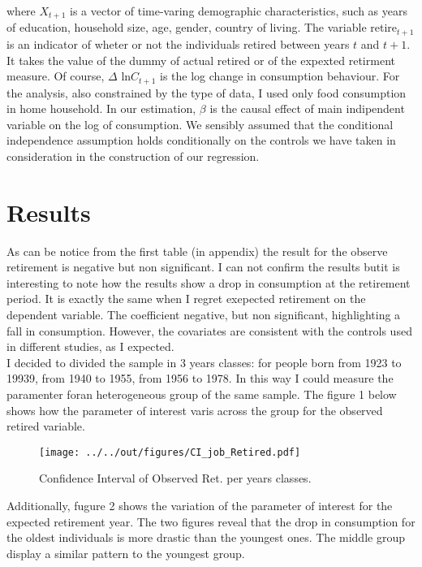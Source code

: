 where $X_{t+1}$ is a vector of time-varing demographic characteristics, such as years of education, household size, age, gender, country of living. The variable retire$_{t+1}$ is an indicator of wheter or not the individuals retired between years $t$ and $t+1$. It takes the value of the dummy of actual retired or of the expexted retirment measure. Of course, $\Delta$ ln$C_{t+1}$ is the log change in consumption behaviour. For the analysis, also constrained by the type of data, I used only food consumption in home household. In our estimation, $\beta$ is the causal effect of main indipendent variable on the log of consumption. We sensibly assumed that the conditional independence assumption holds conditionally on the controls we have taken in consideration in the construction of our regression.

\section{Results}
\label{sec:results}

As can be notice from the first table (in appendix) the result for the observe retirement is negative but non significant. I can not confirm the results butit is interesting to note how the results show a drop in consumption at the retirement period. It is exactly the same when I regret exepected retirement on the dependent variable. The coefficient negative, but non significant, highlighting a fall in consumption. However, the covariates are consistent with the controls used in different studies, as I expected.
\\\hspace*{4mm} I decided to divided the sample in 3 years classes: for people born from 1923 to 19939, from 1940 to 1955, from 1956 to 1978. In this way I could measure the paramenter foran  heterogeneous group of the same sample. The figure 1  below shows how the parameter of interest varis across the group for the observed retired variable.
\begin{figure}[h]
\centering
\texttt{[image: ../../out/figures/CI\_job\_Retired.pdf]}
\caption{Confidence Interval of Observed Ret. per years classes.}
\end{figure}

Additionally, fugure 2 shows the variation of the parameter of interest for the expected retirement year. The two figures reveal that the drop in consumption for the oldest individuals is more drastic than the youngest ones. The middle group display a similar pattern to the youngest group.


